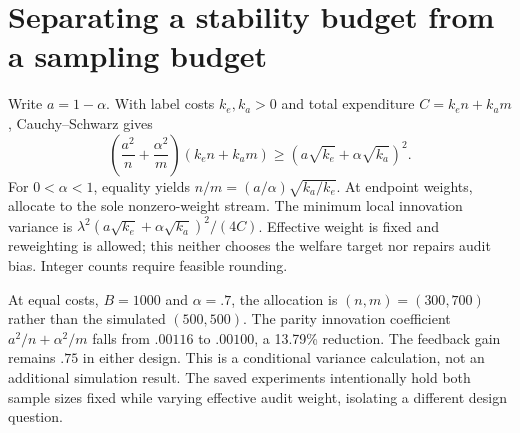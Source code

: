 \section{Separating a stability budget from a sampling budget}\label{app:budget}
Write $a=1-\alpha$. With label costs $k_e,k_a>0$ and total expenditure $C=k_en+k_am$, Cauchy--Schwarz gives
\[
\left(\frac{a^2}{n}+\frac{\alpha^2}{m}\right)(k_en+k_am)
\ge(a\sqrt{k_e}+\alpha\sqrt{k_a})^2.
\]
For $0<\alpha<1$, equality yields $n/m=(a/\alpha)\sqrt{k_a/k_e}$. At endpoint weights, allocate to the sole nonzero-weight stream. The minimum local innovation variance is $\lambda^2(a\sqrt{k_e}+\alpha\sqrt{k_a})^2/(4C)$. Effective weight is fixed and reweighting is allowed; this neither chooses the welfare target nor repairs audit bias. Integer counts require feasible rounding.

At equal costs, $B=1000$ and $\alpha=.7$, the allocation is $(n,m)=(300,700)$ rather than the simulated $(500,500)$. The parity innovation coefficient $a^2/n+\alpha^2/m$ falls from $.00116$ to $.00100$, a 13.79\% reduction. The feedback gain remains $.75$ in either design. This is a conditional variance calculation, not an additional simulation result. The saved experiments intentionally hold both sample sizes fixed while varying effective audit weight, isolating a different design question.
